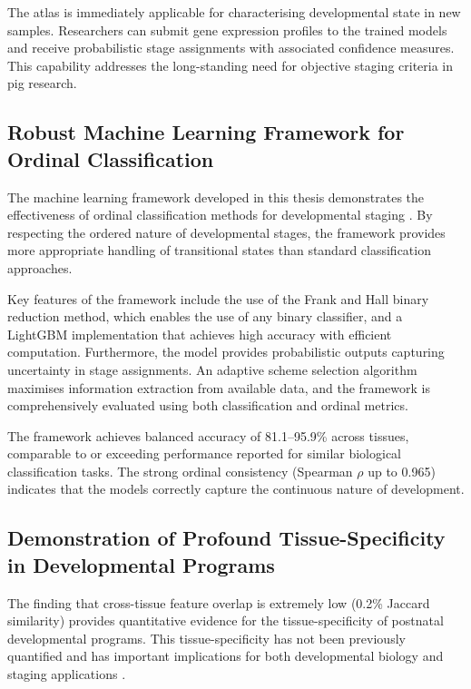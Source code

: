 The atlas is immediately applicable for characterising developmental state in new samples. Researchers can submit gene expression profiles to the trained models and receive probabilistic stage assignments with associated confidence measures. This capability addresses the long-standing need for objective staging criteria in pig research.

\subsection{Robust Machine Learning Framework for Ordinal Classification}

The machine learning framework developed in this thesis demonstrates the effectiveness of ordinal classification methods for developmental staging \parencite{frank_simple_2001}. By respecting the ordered nature of developmental stages, the framework provides more appropriate handling of transitional states than standard classification approaches.

Key features of the framework include the use of the Frank and Hall binary reduction method, which enables the use of any binary classifier, and a LightGBM \parencite{ke_lightgbm_2017} implementation that achieves high accuracy with efficient computation. Furthermore, the model provides probabilistic outputs capturing uncertainty in stage assignments. An adaptive scheme selection algorithm maximises information extraction from available data, and the framework is comprehensively evaluated using both classification and ordinal metrics.

The framework achieves balanced accuracy of 81.1--95.9\% across tissues, comparable to or exceeding performance reported for similar biological classification tasks. The strong ordinal consistency (Spearman $\rho$ up to 0.965) indicates that the models correctly capture the continuous nature of development.

\subsection{Demonstration of Profound Tissue-Specificity in Developmental Programs}

The finding that cross-tissue feature overlap is extremely low (0.2\% Jaccard similarity) provides quantitative evidence for the tissue-specificity of postnatal developmental programs. This tissue-specificity has not been previously quantified and has important implications for both developmental biology and staging applications \parencite{cardoso-moreira_gene_2019}.

